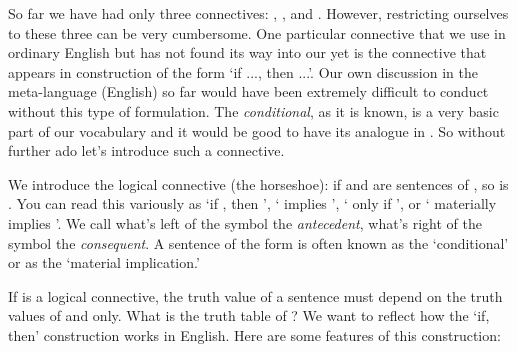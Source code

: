 So far we have had only three connectives: \p{\land}, \p{\lor}, and \p{\lnot}.  
However, restricting ourselves to these three can be very cumbersome.  One 
particular connective that we use in ordinary English but has not  found its way 
into our \lL{} yet is the connective that appears in construction of the form 
`if ..., then ...'.  Our own discussion in the meta-language (English) so far 
would have been extremely difficult to conduct without this type of formulation.  
The \emph{conditional}, as it is known, is a very basic part of our vocabulary 
and it would be good to have its analogue in \lL{}.  So without further ado 
let's introduce such a connective.

We introduce the logical connective \p{\limplies} (the horseshoe): if  
and  are sentences of \lL{}, so is .  You can read 
this variously as `if , then ', ` implies ', ` 
only if ', or ` materially implies '.  We call what's left 
of the \p{\limplies} symbol the \emph{antecedent}, what's right of the symbol 
the \emph{consequent}. A sentence of the form  is often 
known as the `conditional' or as the `material implication.' 

If \p{\limplies} is a logical connective, the truth value of a sentence  must depend on the truth values of  and  only.  
What is the truth table of \p{\limplies}? We want \p{\limplies} to reflect how 
the `if, then' construction works in English. Here are some features of this 
construction:

